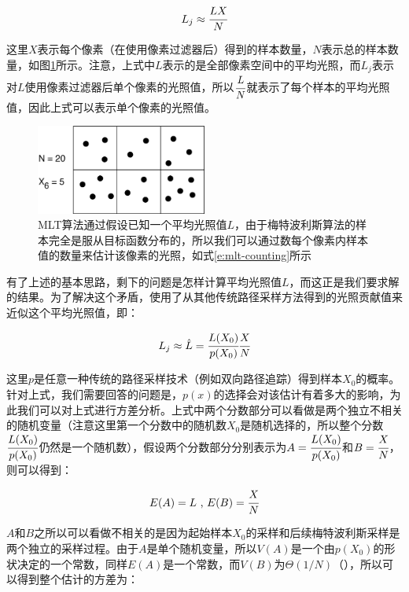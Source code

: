\begin{equation}\label{e:mlt-counting}
	L_j\approx \cfrac{{L}X}{N}
\end{equation}

\noindent 这里$X$表示每个像素（在使用像素过滤器后）得到的样本数量，$N$表示总的样本数量，如图\ref{f:mlt-mlt-counting}所示。注意，上式中${L}$表示的是全部像素空间中的平均光照，而$L_j$表示对$L$使用像素过滤器后单个像素的光照值，所以$ \cfrac{{L}}{N}$就表示了每个样本的平均光照值，因此上式可以表示单个像素的光照值。

\begin{figure}
	\sidecaption
	\includegraphics[width=0.5\textwidth]{figures/mlt/mlt-counting}
	\caption{MLT算法通过假设已知一个平均光照值${L}$，由于梅特波利斯算法的样本完全是服从目标函数分布的，所以我们可以通过数每个像素内样本值的数量来估计该像素的光照，如式\ref{e:mlt-counting}所示}
	\label{f:mlt-mlt-counting}
\end{figure}

有了上述的基本思路，剩下的问题是怎样计算平均光照值${L}$，而这正是我们要求解的结果。为了解决这个矛盾，\cite{a:MetropolisLightTransport}使用了从其他传统路径采样方法得到的光照贡献值来近似这个平均光照值，即：

\begin{equation}\label{e:mlt-unbiased}
	L_j\approx\hat{L}= \cfrac{L(X_0)}{p(X_0)} \cfrac{X}{N}
\end{equation}

这里$p$是任意一种传统的路径采样技术（例如双向路径追踪）得到样本$X_0$的概率。针对上式，我们需要回答的问题是，$p(x)$的选择会对该估计有着多大的影响，为此我们可以对上式进行方差分析。上式中两个分数部分可以看做是两个独立不相关的随机变量（注意这里第一个分数中的随机数$X_0$是随机选择的，所以整个分数$ \cfrac{L(X_0)}{p(X_0)}$仍然是一个随机数），假设两个分数部分分别表示为$A= \cfrac{L(X_0)}{p(X_0)}$和$B= \cfrac{X}{N}$，则可以得到：

\begin{equation}
	E(A)={L}\text{ , }
	E(B)= \cfrac{X}{{N}}
\end{equation}

$A$和$B$之所以可以看做不相关的是因为起始样本$X_0$的采样和后续梅特波利斯采样是两个独立的采样过程。由于$A$是单个随机变量，所以$V(A)$是一个由$p(X_0)$的形状决定的一个常数，同样$E(A)$是一个常数，而$V(B)$为$\Theta(1/N)$（\cite{a:AVarianceAnalysisoftheMetropolisLightTransportAlgorithm}），所以可以得到整个估计的方差为：

